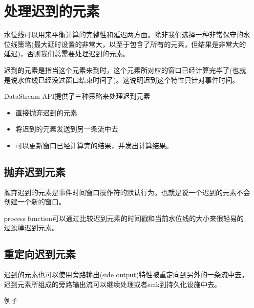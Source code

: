 \documentclass[cn,11pt,chinese]{elegantbook}
\begin{document}
\section{处理迟到的元素}

水位线可以用来平衡计算的完整性和延迟两方面。除非我们选择一种非常保守的水位线策略(最大延时设置的非常大，以至于包含了所有的元素，但结果是非常大的延迟)，否则我们总需要处理迟到的元素。

迟到的元素是指当这个元素来到时，这个元素所对应的窗口已经计算完毕了(也就是说水位线已经没过窗口结束时间了)。这说明迟到这个特性只针对事件时间。

DataStream API提供了三种策略来处理迟到元素

\begin{itemize}
    \item 直接抛弃迟到的元素
    \item 将迟到的元素发送到另一条流中去
    \item 可以更新窗口已经计算完的结果，并发出计算结果。    
\end{itemize}

\subsection{抛弃迟到元素}

抛弃迟到的元素是事件时间窗口操作符的默认行为。也就是说一个迟到的元素不会创建一个新的窗口。

process function可以通过比较迟到元素的时间戳和当前水位线的大小来很轻易的过滤掉迟到元素。

\subsection{重定向迟到元素}

迟到的元素也可以使用旁路输出(side output)特性被重定向到另外的一条流中去。迟到元素所组成的旁路输出流可以继续处理或者sink到持久化设施中去。

例子
\end{document}

